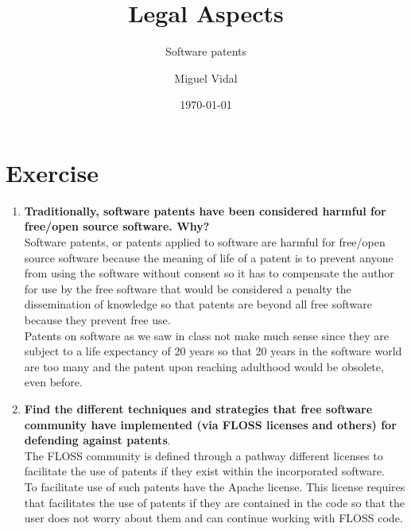 \documentclass[11pt]{scrartcl}
\title{\textbf{Legal Aspects}}
\subtitle{Software patents}
\author{Miguel Vidal}
\date{\today}
\begin{document}
\maketitle

\section{Exercise}

\begin{enumerate}
	\item \textbf{Traditionally, software patents have been considered harmful for free/open source software. Why?}\\

	Software patents, or patents applied to software are harmful for free/open source software because the meaning of life of a patent is to prevent anyone from using the software without consent so it has to compensate the author for use by the free software that would be considered a penalty the dissemination of knowledge so that patents are beyond all free software because they prevent free use.\\

	Patents on software as we saw in class not make much sense since they are subject to a life expectancy of 20 years so that 20 years in the software world are too many and the patent upon reaching adulthood would be obsolete, even before.

	\item \textbf{Find the different techniques and strategies that free software community have implemented (via FLOSS licenses and others) for defending against patents}.\\

	The FLOSS community is defined through a pathway different licenses to facilitate the use of patents if they exist within the incorporated software.\\

	To facilitate use of such patents have the Apache license. This license requires that facilitates the use of patents if they are contained in the code so that the user does not worry about them and can continue working with FLOSS code.
\end{enumerate}
 
\end{document}
